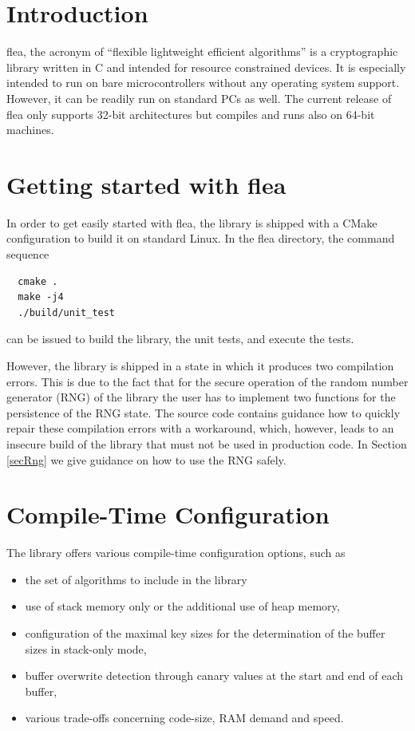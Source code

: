 \documentclass[a4paper,11pt]{scrartcl}
\begin{document}
\newpage

\section{Introduction}
flea, the acronym of ``flexible lightweight efficient algorithms'' is a
cryptographic library written in C and intended for resource
constrained devices. 
It is especially intended to run on bare microcontrollers without
any operating system support. However, it can be readily run on standard PCs as
well. The current release of flea only supports 32-bit architectures but
compiles and runs also on 64-bit machines.


  \section{Getting started with flea}

  In order to get easily started with flea, the library is shipped with a CMake
  configuration to build it on standard Linux. In the
  flea directory, the command sequence 
  \begin{verbatim}
  cmake .
  make -j4
  ./build/unit_test
  \end{verbatim}
  can be issued to build the library, the unit tests, and execute the tests.

  However, the library is shipped in a state in which it produces two
  compilation errors. This is due to the fact that for the secure operation of
  the random number generator (RNG) of the library the user has to implement two
  functions for the persistence of the RNG state. The source code contains
  guidance how to quickly repair these compilation errors with a workaround,
  which, however, leads to an insecure build of the library that must not be
  used in production code. In Section \ref{secRng} we give guidance on how to use
  the RNG safely.

  \section{Compile-Time Configuration}

The library offers various compile-time
configuration options, such as 
\begin{itemize}
  \item the set of algorithms to include in the library
  \item use of stack memory only or the additional use of heap memory,
  \item configuration of the maximal key sizes for the determination of the
    buffer sizes in stack-only mode,
  \item buffer overwrite detection through canary values at the start and end of
    each buffer,
  \item various trade-offs concerning code-size, RAM demand and speed.
  \end{itemize}
\end{document}
